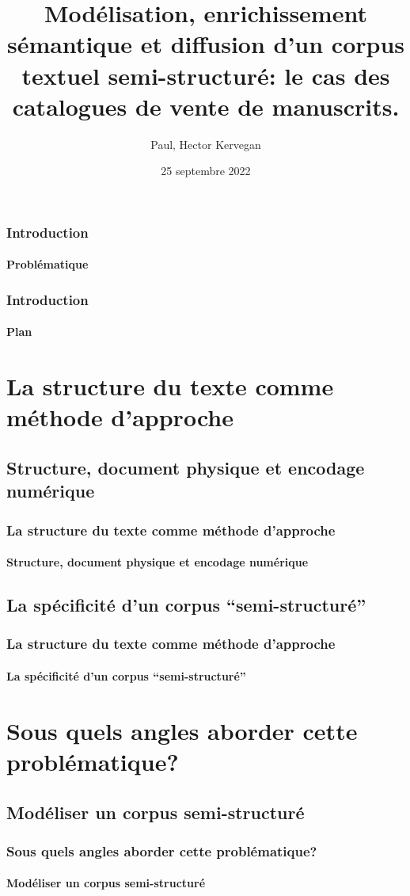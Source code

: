 \documentclass{beamer}
\title{Modélisation, enrichissement sémantique et diffusion d'un corpus textuel semi-structuré: le cas des catalogues de vente de manuscrits.}
\date{25 septembre 2022}
\author[Paul H. Kervegan]{Paul, Hector Kervegan}
\begin{document}
	

\begin{frame}
	\titlepage
\end{frame}

\begin{frame}
	\frametitle{Introduction}
	\framesubtitle{Problématique}
	
\end{frame}

\begin{frame}
	\frametitle{Introduction}
	\framesubtitle{Plan}
	\tableofcontents
\end{frame}


\section{La structure du texte comme méthode d'approche}
\subsection{Structure, document physique et encodage numérique}
\begin{frame}
	\frametitle{La structure du texte comme méthode d'approche}
	\framesubtitle{Structure, document physique et encodage numérique}
	
\end{frame}

\subsection{La spécificité d'un corpus \enquote{semi-structuré}}
\begin{frame}
	\frametitle{La structure du texte comme méthode d'approche}
	\framesubtitle{La spécificité d'un corpus \enquote{semi-structuré}}
	
\end{frame}

\section{Sous quels angles aborder cette problématique?}
\subsection{Modéliser un corpus semi-structuré}
\begin{frame}
	\frametitle{Sous quels angles aborder cette problématique?}
	\framesubtitle{Modéliser un corpus semi-structuré}

\end{frame}
\end{document}
